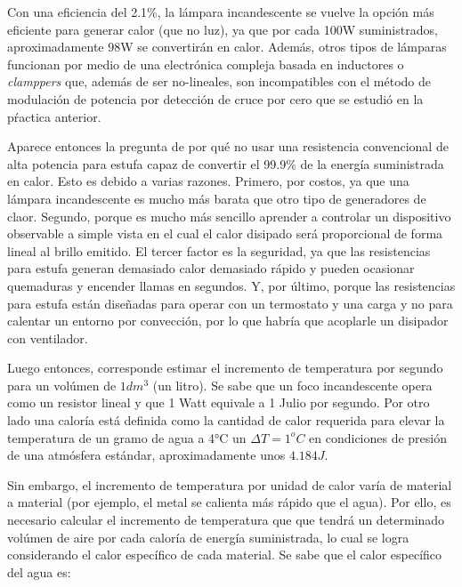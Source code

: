 Con una eficiencia del 2.1\%, la lámpara incandescente se vuelve la opción más eficiente para generar calor (que no luz), ya que por cada 100W suministrados, aproximadamente 98W se convertirán en calor.
Además, otros tipos de lámparas funcionan por medio de una electrónica compleja basada en inductores o \emph{clamppers} que, además de ser no-lineales, son incompatibles con el método de modulación de potencia por detección de cruce por cero que se estudió en la pŕactica anterior.

Aparece entonces la pregunta de por qué no usar una resistencia convencional de alta potencia para estufa capaz de convertir el 99.9\% de la energía suministrada en calor.
Esto es debido a varias razones.
Primero, por costos, ya que una lámpara incandescente es mucho más barata que otro tipo de generadores de claor.
Segundo, porque es mucho más sencillo aprender a controlar un dispositivo observable a simple vista en el cual el calor disipado será proporcional de forma lineal al brillo emitido.
El tercer factor es la seguridad, ya que las resistencias para estufa generan demasiado calor demasiado rápido y pueden ocasionar quemaduras y encender llamas en segundos.
Y, por último, porque las resistencias para estufa están diseñadas para operar con un termostato y una carga y no para calentar un entorno por convección, por lo que habría que acoplarle un disipador con ventilador.

Luego entonces, corresponde estimar el incremento de temperatura por segundo para un volúmen de $1dm^3$ (un litro).
Se sabe que un foco incandescente opera como un resistor lineal y que 1 Watt equivale a 1 Julio por segundo.
Por otro lado una caloría está definida como la cantidad de calor requerida para elevar la temperatura de un gramo de agua a 4°C un $\Delta T = 1^{o}C$ en condiciones de presión de una atmósfera estándar, aproximadamente unos $4.184J$.

Sin embargo, el incremento de temperatura por unidad de calor varía de material a material (por ejemplo, el metal se calienta más rápido que el agua).
Por ello, es necesario calcular el incremento de temperatura que que tendrá un determinado volúmen de aire por cada caloría de energía suministrada, lo cual se logra considerando el calor específico de cada material.
Se sabe que el calor específico del agua es:\footnotemark{}

